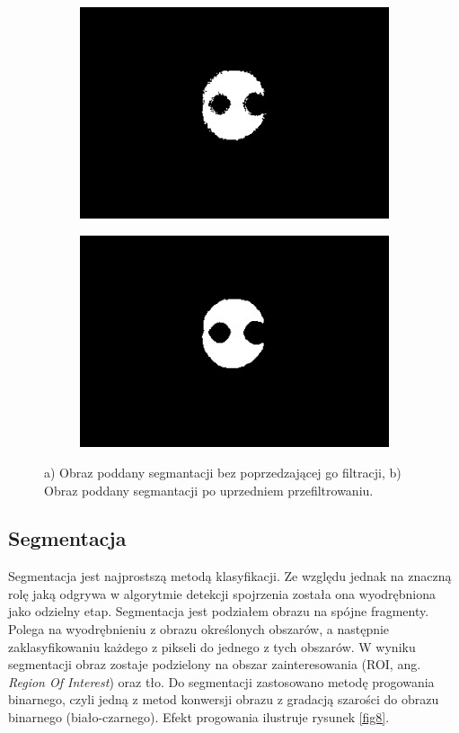 \begin{figure}[h!]
  \begin{subfigure}[h!]{0.3\textwidth}\subcaption{\label{fig7a}}
    \centering
    \includegraphics[scale=0.4]{images/7.png}
  \end{subfigure}\hspace{2.5cm}
  \begin{subfigure}[h!]{0.3\textwidth}\subcaption{\label{fig7b}}
    \centering
    \includegraphics[scale=0.4]{images/8.png}
  \end{subfigure}
  \caption{{a)} Obraz poddany segmantacji bez poprzedzającej go filtracji, {b)} Obraz poddany segmantacji po uprzedniem przefiltrowaniu. \label{fig7}}
\end{figure}

\subsection{Segmentacja}
Segmentacja jest najprostszą metodą klasyfikacji. Ze względu jednak na znaczną rolę jaką odgrywa w algorytmie detekcji spojrzenia została ona wyodrębniona jako odzielny etap. Segmentacja jest podziałem obrazu na spójne fragmenty. Polega na wyodrębnieniu z obrazu określonych obszarów, a następnie zaklasyfikowaniu każdego z pikseli do jednego z tych obszarów. W wyniku segmentacji obraz zostaje podzielony na obszar zainteresowania (ROI, ang. \textit{Region Of Interest}) oraz tło. Do segmentacji zastosowano metodę progowania binarnego, czyli jedną z metod konwersji obrazu z gradacją szarości do obrazu binarnego (biało-czarnego). Efekt progowania ilustruje rysunek \ref{fig8}.

